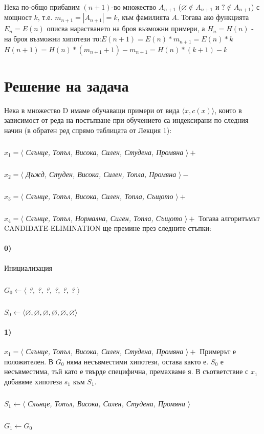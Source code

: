 \documentclass[12pt]{article}
\begin{document}
	Нека по-общо прибавим $(n+1)$-во множество $A_{n+1}$ ($\varnothing \notin A_{n+1}$ и  $? \notin A_{n+1}$)  \newline с мощност $k$, т.е. $m_{n+1} =|A_{n+1}|=k$, към фамилията $A$. \newline\newline 
	Тогава ако функцията $E_{n} = E(n)$ описва нарастването на броя възможни примери, а $H_{n} = H(n)$ - на броя възможни хипотези то:\newline \newline $E(n+1) = E(n)*m_{n+1} = E(n)*k$ \newline $H(n+1) = H(n)*(m_{n+1}+1) - m_{n+1} = H(n)*(k+1) - k$
	
	\newpage
	
	
	\section{Решение на задача }
	
	Нека в множество D имаме обучаващи примери от вида $\langle x, c(x) \rangle$, които в зависимост от реда на постъпване при обучението са индексирани по следния начин (в обратен ред спрямо таблицата от Лекция 1):
		\subparagraph{}
		$x_{1} = \langle $ \textit{Слънце, Топъл, Висока, Силен, Студена, Промяна} $\rangle  +$
		\subparagraph{}
		$x_{2} = \langle $ \textit{Дъжд, Студен, Висока, Силен, Топла, Промяна} $\rangle  -$
		\subparagraph{}
		$x_{3} = \langle $ \textit{Слънце, Топъл, Висока, Силен, Топла, Същото} $\rangle  +$
		\subparagraph{}
		$x_{4} = \langle $ \textit{Слънце, Топъл, Нормална, Силен, Топла, Същото} $\rangle  +$
	\newline\newline
	Тогава алгоритъмът CANDIDATE-ELIMINATION ще премине през следните стъпки:\newline
	
	
	\paragraph{0)} Инициализация
		\subparagraph{}
		$G_{0} \leftarrow \langle $ \textit{?, ?, ?, ?, ?, ?} $\rangle$ 
		\subparagraph{} 
		$S_{0} \leftarrow \langle  \varnothing, \varnothing, \varnothing, \varnothing, \varnothing, \varnothing \rangle$
	
	\paragraph{1)} $x_{1} = \langle $ \textit{Слънце, Топъл, Висока, Силен, Студена, Промяна} $\rangle  +$ \newline\newline
	Примерът е положителен. В $G_{0}$ няма несъвместими хипотези, остава както е. $S_{0}$ е несъвместима, тъй като е твърде специфична, премахваме я. В съответствие с $x_{1}$ добавяме хипотеза $s_{1}$ към $S_{1}$.
		\subparagraph{}
		$S_{1} \leftarrow \langle $ \textit{Слънце, Топъл, Висока, Силен, Студена, Промяна} $ \rangle$
		\subparagraph{}
		$G_{1} \leftarrow G_{0}$
		
\end{document}
